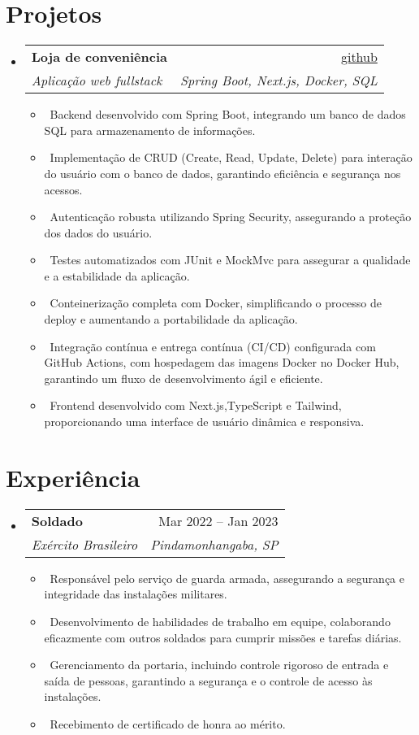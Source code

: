 \documentclass[letterpaper,10pt]{article}
\makeatletter
\newcommand{\resumeItem}[1]{\item\small{#1}}
\newcommand{\resumeSubheading}[4]{
\vspace{-1pt}\item
  \begin{tabular*}{0.97\textwidth}[t]{l@{\extracolsep{\fill}}r}
    \textbf{#1} & #2 \\
    \textit{#3} & \textit{#4} \\
  \end{tabular*}\vspace{-7pt}
}
\newcommand{\resumeSubHeadingList}{\begin{itemize}[leftmargin=0.15in, label={}]}
\newcommand{\resumeSubHeadingListEnd}{\end{itemize}}
\makeatother
\begin{document}
\section{Projetos}
\resumeSubHeadingList
  \resumeSubheading
      {Loja de conveniência}{\href{https://github.com/diegorezm/convenience.store.api}{github}} 
      {Aplicação web fullstack}{Spring Boot, Next.js, Docker, SQL}
      \resumeSubHeadingList
          \resumeItem{\textbullet\ Backend desenvolvido com Spring Boot, integrando um banco de dados SQL para armazenamento de informações.}
          \resumeItem{\textbullet\ Implementação de CRUD (Create, Read, Update, Delete) para interação do usuário com o banco de dados, garantindo eficiência e segurança nos acessos.}
          \resumeItem{\textbullet\ Autenticação robusta utilizando Spring Security, assegurando a proteção dos dados do usuário.}
          \resumeItem{\textbullet\ Testes automatizados com JUnit e MockMvc para assegurar a qualidade e a estabilidade da aplicação.}
          \resumeItem{\textbullet\ Conteinerização completa com Docker, simplificando o processo de deploy e aumentando a portabilidade da aplicação.}
          \resumeItem{\textbullet\ Integração contínua e entrega contínua (CI/CD) configurada com GitHub Actions, com hospedagem das imagens Docker no Docker Hub, garantindo um fluxo de desenvolvimento ágil e eficiente.}
          \resumeItem{\textbullet\ Frontend desenvolvido com Next.js,TypeScript e Tailwind, proporcionando uma interface de usuário dinâmica e responsiva.}
      \resumeSubHeadingListEnd
\resumeSubHeadingListEnd

\section{Experiência}
\resumeSubHeadingList
  \resumeSubheading
      {Soldado}{Mar 2022 -- Jan 2023}
      {Exército Brasileiro}{Pindamonhangaba, SP}
      \resumeSubHeadingList
          \resumeItem{\textbullet\ Responsável pelo serviço de guarda armada, assegurando a segurança e integridade das instalações militares.}
          \resumeItem{\textbullet\ Desenvolvimento de habilidades de trabalho em equipe, colaborando eficazmente com outros soldados para cumprir missões e tarefas diárias.}
          \resumeItem{\textbullet\ Gerenciamento da portaria, incluindo controle rigoroso de entrada e saída de pessoas, garantindo a segurança e o controle de acesso às instalações.}
          \resumeItem{\textbullet\ Recebimento de certificado de honra ao mérito.}
      \resumeSubHeadingListEnd
\resumeSubHeadingListEnd
\end{document}
